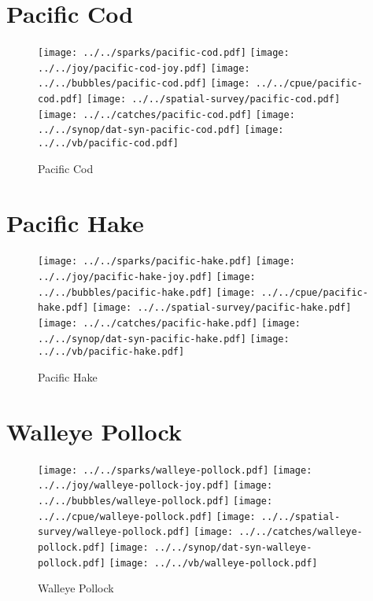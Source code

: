\section{Pacific Cod}

\begin{figure}[htbp]
\centering
\texttt{[image: ../../sparks/pacific-cod.pdf]}
\texttt{[image: ../../joy/pacific-cod-joy.pdf]}
\texttt{[image: ../../bubbles/pacific-cod.pdf]}
\texttt{[image: ../../cpue/pacific-cod.pdf]}
\texttt{[image: ../../spatial-survey/pacific-cod.pdf]}
\texttt{[image: ../../catches/pacific-cod.pdf]}
\texttt{[image: ../../synop/dat-syn-pacific-cod.pdf]}
\texttt{[image: ../../vb/pacific-cod.pdf]}
\caption{Pacific Cod}
\end{figure}
\clearpage
\section{Pacific Hake}

\begin{figure}[htbp]
\centering
\texttt{[image: ../../sparks/pacific-hake.pdf]}
\texttt{[image: ../../joy/pacific-hake-joy.pdf]}
\texttt{[image: ../../bubbles/pacific-hake.pdf]}
\texttt{[image: ../../cpue/pacific-hake.pdf]}
\texttt{[image: ../../spatial-survey/pacific-hake.pdf]}
\texttt{[image: ../../catches/pacific-hake.pdf]}
\texttt{[image: ../../synop/dat-syn-pacific-hake.pdf]}
\texttt{[image: ../../vb/pacific-hake.pdf]}
\caption{Pacific Hake}
\end{figure}
\clearpage
\section{Walleye Pollock}

\begin{figure}[htbp]
\centering
\texttt{[image: ../../sparks/walleye-pollock.pdf]}
\texttt{[image: ../../joy/walleye-pollock-joy.pdf]}
\texttt{[image: ../../bubbles/walleye-pollock.pdf]}
\texttt{[image: ../../cpue/walleye-pollock.pdf]}
\texttt{[image: ../../spatial-survey/walleye-pollock.pdf]}
\texttt{[image: ../../catches/walleye-pollock.pdf]}
\texttt{[image: ../../synop/dat-syn-walleye-pollock.pdf]}
\texttt{[image: ../../vb/walleye-pollock.pdf]}
\caption{Walleye Pollock}
\end{figure}
\clearpage

